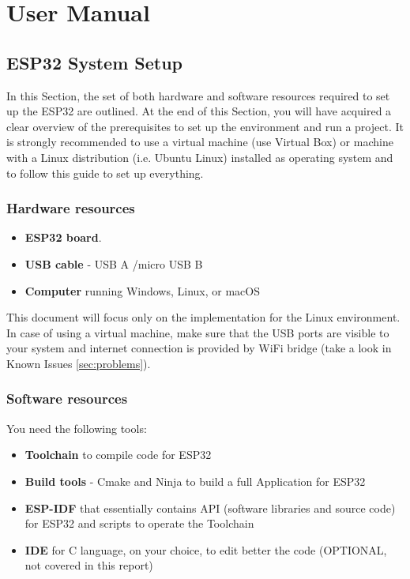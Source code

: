 \chapter{User Manual}
\label{usermanual}

\section{ESP32 System Setup}\label{sec:SysSetupESP32}
In this Section, the set of both hardware and software resources required to set up the ESP32 are outlined. 
At the end of this Section, you will have acquired a clear overview of the
prerequisites to set up the environment and run a project. It is strongly recommended to use a virtual machine (use Virtual Box\cite{virtualbox}) 
or machine with a Linux distribution (i.e. Ubuntu Linux\cite{Ubuntu}) installed as operating system and to follow this guide to set up everything.

\subsection{Hardware resources}

\begin{itemize}
  \item \textbf{ESP32 board}.
  \item \textbf{USB cable} - USB A /micro USB B
  \item \textbf{Computer} running Windows, Linux, or macOS
\end{itemize}

This document will focus only on the implementation for the Linux environment. In case of using a virtual machine, 
make sure that the USB ports are visible to your system and internet connection is provided by WiFi bridge (take a look in Known Issues \ref{sec:problems}).

\subsection{Software resources}
You need the following tools:

\begin{itemize}
  \item \textbf{Toolchain} to compile code for ESP32
  \item \textbf{Build tools} - Cmake and Ninja to build a full Application for ESP32
  \item \textbf{ESP-IDF} that essentially contains API (software libraries and source code) for ESP32 and scripts to operate the Toolchain
  \item \textbf{IDE} for C language, on your choice, to edit better the code (OPTIONAL, not covered in this report) 
\end{itemize}

